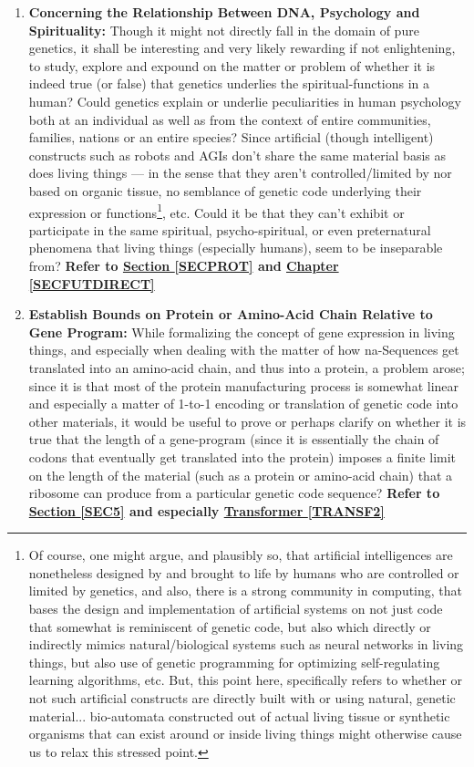 \documentclass[a4paper, 18pt]{book} %
\begin{document}
\begin{enumerate}
\item \textbf{Concerning the Relationship Between DNA, Psychology and Spirituality:} Though it might not directly fall in the domain of pure genetics, it shall be interesting and very likely rewarding if not enlightening, to study, explore and expound on the matter or problem of whether it is indeed true (or false) that genetics underlies the spiritual-functions in a human? Could genetics explain or underlie peculiarities in human psychology both at an individual as well as from the context of entire communities, families, nations or an entire species? Since artificial (though intelligent) constructs such as robots and AGIs don't share the same material basis as does living things --- in the sense that they aren't controlled/limited by nor based on organic tissue, no semblance of genetic code underlying their expression or functions\footnote{Of course, one might argue, and plausibly so, that artificial intelligences are nonetheless designed by and brought to life by humans who are controlled or limited by genetics, and also, there is a strong community in computing, that bases the design and implementation of artificial systems on not just code that somewhat is reminiscent of genetic code, but also which directly or indirectly mimics natural/biological systems such as neural networks in living things, but also use of genetic programming for optimizing self-regulating learning algorithms, etc. But, this point here, specifically refers to whether or not such artificial constructs are directly built with or using natural, genetic material... bio-automata constructed out of actual living tissue or synthetic organisms that can exist around or inside living things might otherwise cause us to relax this stressed point.}, etc. Could it be that they can't exhibit or participate in the same spiritual, psycho-spiritual, or even preternatural phenomena that living things (especially humans), seem to be inseparable from?  \textbf{Refer to \textbf{\hyperref[SECPROT]{Section \ref{SECPROT}}} and \textbf{\hyperref[SECFUTDIRECT]{Chapter \ref{SECFUTDIRECT}}}} 

\item \textbf{Establish Bounds on Protein or Amino-Acid Chain Relative to Gene Program:} While formalizing the concept of gene expression in living things, and especially when dealing with the matter of how na-Sequences get translated into an amino-acid chain, and thus into a protein, a problem arose; since it is that most of the protein manufacturing process is somewhat linear and especially a matter of 1-to-1 encoding or translation of genetic code into other materials, it would be useful to prove or perhaps clarify on whether it is true that the length of a gene-program (since it is essentially the chain of codons that eventually get translated into the protein) imposes a finite limit on the length of the material (such as a protein or amino-acid chain) that a ribosome can produce from a particular genetic code sequence? \textbf{Refer to \textbf{\hyperref[SEC5]{Section \ref{SEC5}}} and especially \textbf{\hyperref[TRANSF2]{Transformer \ref{TRANSF2}}}} 



\end{enumerate}
\end{document}
